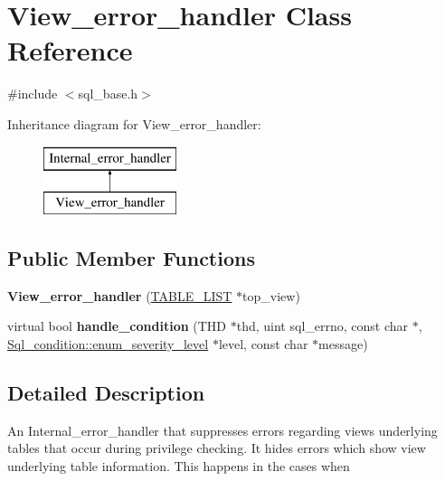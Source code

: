 \hypertarget{classView__error__handler}{}\section{View\+\_\+error\+\_\+handler Class Reference}
\label{classView__error__handler}


{\ttfamily \#include $<$sql\+\_\+base.\+h$>$}

Inheritance diagram for View\+\_\+error\+\_\+handler\+:\begin{figure}[H]
\begin{center}
\leavevmode
\includegraphics[height=2.000000cm]{classView__error__handler}
\end{center}
\end{figure}
\subsection*{Public Member Functions}
\begin{DoxyCompactItemize}
\item 
\mbox{\label{classView__error__handler_a7f0edb97ed244eed2f94712affed6636}} 
{\bfseries View\+\_\+error\+\_\+handler} (\mbox{\hyperlink{structTABLE__LIST}{T\+A\+B\+L\+E\+\_\+\+L\+I\+ST}} $\ast$top\+\_\+view)
\item 
\mbox{\label{classView__error__handler_a7a1d1337585ab03d90fe9bdbf9fec504}} 
virtual bool {\bfseries handle\+\_\+condition} (T\+HD $\ast$thd, uint sql\+\_\+errno, const char $\ast$, \mbox{\hyperlink{classSql__condition_ab0602581e19cddb609bfe10c44be4e83}{Sql\+\_\+condition\+::enum\+\_\+severity\+\_\+level}} $\ast$level, const char $\ast$message)
\end{DoxyCompactItemize}


\subsection{Detailed Description}
An Internal\+\_\+error\+\_\+handler that suppresses errors regarding views\textquotesingle{} underlying tables that occur during privilege checking. It hides errors which show view underlying table information. This happens in the cases when



